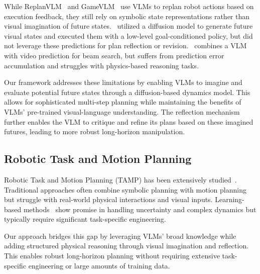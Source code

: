 While ReplanVLM~\citep{mei2024replanvlm} and GameVLM~\citep{mei2024gamevlm} use VLMs to replan robot actions based on execution feedback, they still rely on symbolic state representations rather than visual imagination of future states.~\citet{black2023susie} utilized a diffusion model to generate future visual states and executed them with a low-level goal-conditioned policy, but did not leverage these predictions for plan reflection or revision.~\citet{du2023videolanguageplanning} combines a VLM with video prediction for beam search, but suffers from prediction error accumulation and struggles with physics-based reasoning tasks.

Our framework addresses these limitations by enabling VLMs to imagine and evaluate potential future states through a diffusion-based dynamics model. This allows for sophisticated multi-step planning while maintaining the benefits of VLMs' pre-trained visual-language understanding. The reflection mechanism further enables the VLM to critique and refine its plans based on these imagined futures, leading to more robust long-horizon manipulation.

\subsection{Robotic Task and Motion Planning}
Robotic Task and Motion Planning (TAMP) has been extensively studied~\citep{kaelbling2011tamp,garrett2020integratedtamp, garrett2020pddlstream}. Traditional approaches often combine symbolic planning with motion planning but struggle with real-world physical interactions and visual inputs. Learning-based methods~\citep{wang2021learningcompositional,driess2020deepvisualreasoninglearning} show promise in handling uncertainty and complex dynamics but typically require significant task-specific engineering.

Our approach bridges this gap by leveraging VLMs' broad knowledge while adding structured physical reasoning through visual imagination and reflection. This enables robust long-horizon planning without requiring extensive task-specific engineering or large amounts of training data.